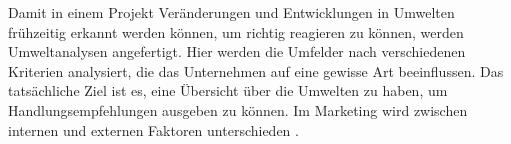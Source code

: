 Damit in einem Projekt Veränderungen und Entwicklungen in Umwelten frühzeitig erkannt werden können, um richtig reagieren zu können, werden Umweltanalysen angefertigt. Hier werden die Umfelder nach verschiedenen Kriterien analysiert, die das Unternehmen auf eine gewisse Art beeinflussen. Das tatsächliche Ziel ist es, eine Übersicht über die Umwelten zu haben, um Handlungsempfehlungen ausgeben zu können. Im Marketing wird zwischen internen und externen Faktoren unterschieden \cite{Wikipedia:2023, Redaktion:2024}.